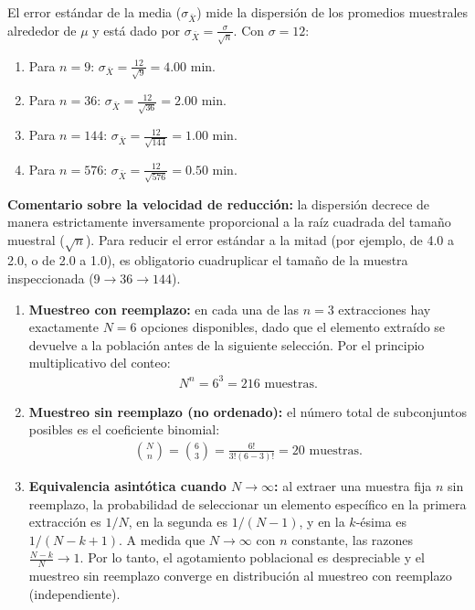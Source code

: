 \begin{solproblema}
	El error estándar de la media ($\sigma_{\bar{X}}$) mide la dispersión de los promedios muestrales alrededor de $\mu$ y está dado por $\sigma_{\bar{X}} = \frac{\sigma}{\sqrt{n}}$. Con $\sigma = 12$:
	\begin{enumerate}
		\item Para $n = 9$: $\sigma_{\bar{X}} = \frac{12}{\sqrt{9}} = 4.00$ min.
		\item Para $n = 36$: $\sigma_{\bar{X}} = \frac{12}{\sqrt{36}} = 2.00$ min.
		\item Para $n = 144$: $\sigma_{\bar{X}} = \frac{12}{\sqrt{144}} = 1.00$ min.
		\item Para $n = 576$: $\sigma_{\bar{X}} = \frac{12}{\sqrt{576}} = 0.50$ min.
	\end{enumerate}
	\textbf{Comentario sobre la velocidad de reducción:} la dispersión decrece de manera estrictamente inversamente proporcional a la raíz cuadrada del tamaño muestral ($\sqrt{n}$). Para reducir el error estándar a la mitad (por ejemplo, de 4.0 a 2.0, o de 2.0 a 1.0), es obligatorio cuadruplicar el tamaño de la muestra inspeccionada ($9 \to 36 \to 144$).
\end{solproblema}

\begin{solproblema}[prob:116017b]
	\begin{enumerate}
		\item \textbf{Muestreo con reemplazo:} en cada una de las $n = 3$ extracciones hay exactamente $N = 6$ opciones disponibles, dado que el elemento extraído se devuelve a la población antes de la siguiente selección. Por el principio multiplicativo del conteo:
		\begin{align}
			N^n = 6^3 = 216 \text{ muestras.}
		\end{align}
		\item \textbf{Muestreo sin reemplazo (no ordenado):} el número total de subconjuntos posibles es el coeficiente binomial:
		\begin{align}
			\binom{N}{n} = \binom{6}{3} = \frac{6!}{3!(6-3)!} = 20 \text{ muestras.}
		\end{align}
		\item \textbf{Equivalencia asintótica cuando $N \to \infty$:} al extraer una muestra fija $n$ sin reemplazo, la probabilidad de seleccionar un elemento específico en la primera extracción es $1/N$, en la segunda es $1/(N-1)$, y en la $k$-ésima es $1/(N-k+1)$. A medida que $N \to \infty$ con $n$ constante, las razones $\frac{N-k}{N} \to 1$. Por lo tanto, el agotamiento poblacional es despreciable y el muestreo sin reemplazo converge en distribución al muestreo con reemplazo (independiente).
	\end{enumerate}
\end{solproblema}

